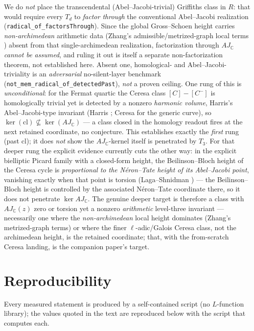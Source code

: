 \documentclass[11pt]{article}
\theoremstyle{definition}
\begin{document}
We do \emph{not} place the transcendental (Abel--Jacobi-trivial) Griffiths class in $R$: that
would require every $T_d$ to \emph{factor through} the conventional Abel--Jacobi realization
(\texttt{radical\_of\_factorsThrough}). Since the global Gross--Schoen height carries
\emph{non-archimedean} arithmetic data (Zhang's admissible/metrized-graph local terms \cite{ZhangGS})
absent from that single-archimedean realization, factorization through $AJ_{\mathbb C}$ \emph{cannot be
assumed}, and ruling it out is itself a separate non-factorization theorem, not established here.
Absent one, homological- and Abel--Jacobi-triviality is an \emph{adversarial} no-silent-layer
benchmark (\texttt{not\_mem\_radical\_of\_detectedPast}), \emph{not} a proven ceiling. One rung of this
is \emph{unconditional}: for the Fermat quartic the Ceresa class $[C]-[C^-]$ is homologically trivial
yet is detected by a nonzero \emph{harmonic volume}, Harris's Abel--Jacobi-type invariant (Harris
\cite{Harris}; Ceresa \cite{Ceresa} for the generic curve), so
$\ker(\mathrm{cl})\not\subseteq\ker(AJ_{\mathbb C})$ --- a class closed in the homology readout fires at
the next retained coordinate, no conjecture. This establishes exactly the
\emph{first} rung (past $\mathrm{cl}$); it does \emph{not} show the $AJ_{\mathbb C}$-kernel itself is
penetrated by $T_3$. For that deeper rung the explicit evidence currently cuts the other way: in the
explicit bielliptic Picard family with a closed-form height, the Beilinson--Bloch height of the
Ceresa cycle is \emph{proportional to the N\'eron--Tate height of its Abel--Jacobi point}, vanishing
exactly when that point is torsion (Laga--Shnidman \cite{LagaShnidman}) --- the Beilinson--Bloch height is
controlled by the associated N\'eron--Tate coordinate there, so it does not penetrate $\ker AJ_{\mathbb C}$. The genuine deeper target
is therefore a class with $AJ_{\mathbb C}(z)$ zero or torsion yet a nonzero \emph{arithmetic}
level-three invariant --- necessarily one where the \emph{non-archimedean} local height dominates
(Zhang's metrized-graph terms) or where the finer $\ell$-adic/Galois Ceresa class, not the archimedean
height, is the retained coordinate; that, with the from-scratch Ceresa landing, is the companion
paper's target.

\appendix
\section{Reproducibility}\label{app:repro}

Every measured statement is produced by a self-contained script (no $L$-function library); the values
quoted in the text are reproduced below with the script that computes each.
\end{document}
